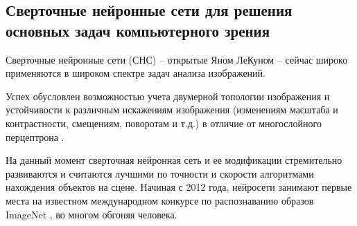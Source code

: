 \subsection{Сверточные нейронные сети для решения основных задач компьютерного зрения}\label{sect-2}

Сверточные нейронные сети (СНС) -- открытые Яном ЛеКуном \cite{lib-lecun-cnn} -- сейчас широко применяются в широком спектре задач анализа изображений.

Успех обусловлен возможностью учета двумерной топологии изображения и устойчивости к различным искажениям изображения (изменениям масштаба и контрастности, смещениям, поворотам и т.д.) в отличие от многослойного перцептрона \cite{lib-perciptrone}.

На данный момент сверточная нейронная сеть и ее модификации стремительно развиваются и считаются лучшими по точности и скорости алгоритмами нахождения объектов на сцене. Начиная с 2012 года, нейросети занимают первые места на известном международном конкурсе по распознаванию образов ImageNet \cite{lib-imagenet}, во многом обгоняя человека.


